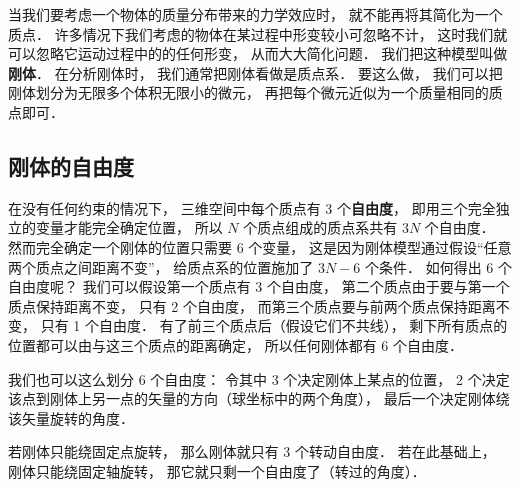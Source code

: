 

当我们要考虑一个物体的质量分布带来的力学效应时， 就不能再将其简化为一个质点． 许多情况下我们考虑的物体在某过程中形变较小可忽略不计， 这时我们就可以忽略它运动过程中的的任何形变， 从而大大简化问题． 我们把这种模型叫做\textbf{刚体}． 在分析刚体时， 我们通常把刚体看做是质点系． 要这么做， 我们可以把刚体划分为无限多个体积无限小的微元， 再把每个微元近似为一个质量相同的质点即可． 

\subsection{刚体的自由度}

在没有任何约束的情况下， 三维空间中每个质点有 3 个\textbf{自由度}， 即用三个完全独立的变量才能完全确定位置， 所以 $N$ 个质点组成的质点系共有 $3N$ 个自由度． 然而完全确定一个刚体的位置只需要 6 个变量， 这是因为刚体模型通过假设“任意两个质点之间距离不变”， 给质点系的位置施加了 $3N - 6$ 个条件． 如何得出 6 个自由度呢？ 我们可以假设第一个质点有 3 个自由度， 第二个质点由于要与第一个质点保持距离不变， 只有 2 个自由度， 而第三个质点要与前两个质点保持距离不变， 只有 1 个自由度． 有了前三个质点后（假设它们不共线）， 剩下所有质点的位置都可以由与这三个质点的距离确定， 所以任何刚体都有 6 个自由度．

我们也可以这么划分 6 个自由度： 令其中 3 个决定刚体上某点的位置， 2 个决定该点到刚体上另一点的矢量的方向（球坐标中的两个角度）， 最后一个决定刚体绕该矢量旋转的角度．

若刚体只能绕固定点旋转， 那么刚体就只有 3 个转动自由度． 若在此基础上， 刚体只能绕固定轴旋转， 那它就只剩一个自由度了（转过的角度）．
